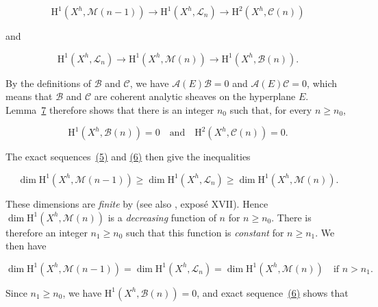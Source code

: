 \begin{equation*}\tag{5}
\mathrm{H}^1(X^h,\mathcal{M}(n-1))
\longrightarrow\mathrm{H}^1(X^h,\mathcal{L}_n)
\longrightarrow\mathrm{H}^2(X^h,\mathcal{C}(n))
\end{equation*}

and

\begin{equation*}\tag{6}
\mathrm{H}^1(X^h,\mathcal{L}_n)
\longrightarrow\mathrm{H}^1(X^h,\mathcal{M}(n))
\longrightarrow\mathrm{H}^1(X^h,\mathcal{B}(n)).
\end{equation*}

By the definitions of $\mathcal{B}$ and $\mathcal{C}$, we have $\mathcal{A}(E)\mathcal{B}=0$ and $\mathcal{A}(E)\mathcal{C}=0$, which means that $\mathcal{B}$ and $\mathcal{C}$ are coherent analytic sheaves on the hyperplane $E$. Lemma~\hyperref[gaga:lemma:7]{7} therefore shows that there is an integer $n_0$ such that, for every $n\geqslant n_0$,

\begin{equation*}
\mathrm{H}^1(X^h,\mathcal{B}(n))=0
\quad\text{and}\quad
\mathrm{H}^2(X^h,\mathcal{C}(n))=0.
\end{equation*}

The exact sequences~\hyperref[gaga:eq:5]{(5)} and \hyperref[gaga:eq:6]{(6)} then give the inequalities

\begin{equation*}\tag{7}
\dim\mathrm{H}^1(X^h,\mathcal{M}(n-1))
\geqslant
\dim\mathrm{H}^1(X^h,\mathcal{L}_n)
\geqslant
\dim\mathrm{H}^1(X^h,\mathcal{M}(n)).
\end{equation*}

These dimensions are \emph{finite} by  (see also , exposé XVII). Hence $\dim\mathrm{H}^1(X^h,\mathcal{M}(n))$ is a \emph{decreasing} function of $n$ for $n\geqslant n_0$. There is therefore an integer $n_1\geqslant n_0$ such that this function is \emph{constant} for $n\geqslant n_1$. We then have

\begin{equation*}\tag{8}
\dim\mathrm{H}^1(X^h,\mathcal{M}(n-1))
=
\dim\mathrm{H}^1(X^h,\mathcal{L}_n)
=
\dim\mathrm{H}^1(X^h,\mathcal{M}(n))
\quad\text{if }n>n_1.
\end{equation*}

Since $n_1\geqslant n_0$, we have $\mathrm{H}^1(X^h,\mathcal{B}(n))=0$, and exact sequence~\hyperref[gaga:eq:6]{(6)} shows that

